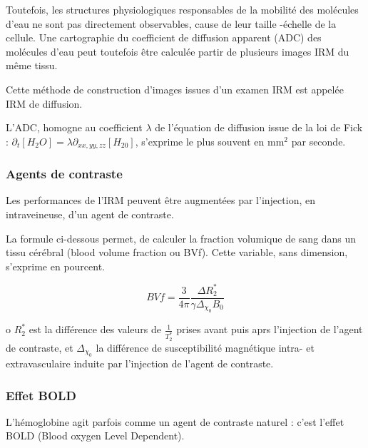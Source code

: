 \par
Toutefois, les structures physiologiques responsables de la mobilit\'e des mol\'ecules d'eau ne sont pas directement observables, %
 cause de leur taille -\'echelle de la cellule. %
Une cartographie du coefficient de diffusion apparent (ADC) des mol\'ecules d'eau peut toutefois \^etre calcul\'ee  partir de plusieurs images IRM du m\^eme tissu.

\par
Cette m\'ethode de construction d'images issues d'un examen IRM est appel\'ee IRM de diffusion.

\par
L'ADC, homogne au coefficient $\lambda$ de l'\'equation de diffusion issue de la loi de Fick : $\partial_t [H_2O]=\lambda \partial_{xx,yy,zz} [H_20]$, %
s'exprime le plus souvent en mm${}^2$ par seconde.

\subsubsection{Agents de contraste}

Les performances de l'IRM peuvent \^etre augment\'ees par l'injection, en intraveineuse, d'un agent de contraste.

\par
La formule ci-dessous permet, de calculer la fraction volumique de sang dans un tissu c\'er\'ebral (blood volume fraction ou BVf). %
Cette variable, sans dimension, s'exprime en pourcent.

\begin{equation}
BVf=\frac{3}{4\pi}\frac{\Delta R_2^{\ast}}{\gamma \Delta_{\chi_0}B_0}
\label{bvf_gd}
\end{equation}

o $R_2^{\ast}$ est la diff\'erence des valeurs de $\frac{1}{T_2^{\ast}}$ prises avant puis aprs l'injection de l'agent de contraste, %
et $\Delta_{\chi_0}$ la diff\'erence de susceptibilit\'e magn\'etique intra- et extravasculaire induite par l'injection de l'agent de contraste.

\subsubsection{Effet BOLD}

L'h\'emoglobine agit parfois comme un agent de contraste naturel : c'est l'effet BOLD (Blood oxygen Level Dependent).

